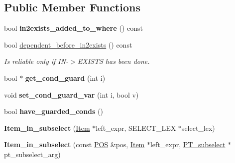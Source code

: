 \subsection*{Public Member Functions}
\begin{DoxyCompactItemize}
\item 
\mbox{\label{classItem__in__subselect_abbe21b054fcbc8b52a917e9a5736f80f}} 
bool {\bfseries in2exists\+\_\+added\+\_\+to\+\_\+where} () const
\item 
\mbox{\label{classItem__in__subselect_a5b336b01f40b739cf5b6fb4859093d3e}} 
bool \mbox{\hyperlink{classItem__in__subselect_a5b336b01f40b739cf5b6fb4859093d3e}{dependent\+\_\+before\+\_\+in2exists}} () const
\begin{DoxyCompactList}\small\item\em Is reliable only if IN-\/$>$E\+X\+I\+S\+TS has been done. \end{DoxyCompactList}\item 
\mbox{\label{classItem__in__subselect_a6efad3c1710eab02c31397002e0b49d0}} 
bool $\ast$ {\bfseries get\+\_\+cond\+\_\+guard} (int i)
\item 
\mbox{\label{classItem__in__subselect_a35f363b8f4d103a5abf34237ee534d0f}} 
void {\bfseries set\+\_\+cond\+\_\+guard\+\_\+var} (int i, bool v)
\item 
\mbox{\label{classItem__in__subselect_aaff0387de68fabb81c120b07cc02d0a0}} 
bool {\bfseries have\+\_\+guarded\+\_\+conds} ()
\item 
\mbox{\label{classItem__in__subselect_a54b7a641603bba8b6e4f09658f4eab58}} 
{\bfseries Item\+\_\+in\+\_\+subselect} (\mbox{\hyperlink{classItem}{Item}} $\ast$left\+\_\+expr, S\+E\+L\+E\+C\+T\+\_\+\+L\+EX $\ast$select\+\_\+lex)
\item 
\mbox{\label{classItem__in__subselect_a68ad0963debb694d921f66a6cd3d95cc}} 
{\bfseries Item\+\_\+in\+\_\+subselect} (const \mbox{\hyperlink{structYYLTYPE}{P\+OS}} \&pos, \mbox{\hyperlink{classItem}{Item}} $\ast$left\+\_\+expr, \mbox{\hyperlink{classPT__subselect}{P\+T\+\_\+subselect}} $\ast$pt\+\_\+subselect\+\_\+arg)

\end{DoxyCompactItemize}
